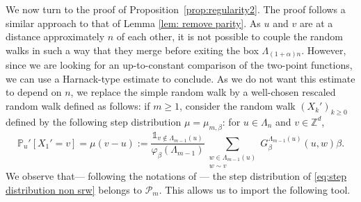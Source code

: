 \documentclass[11pt,a4paper]{article}
\numberwithin{equation}{section}
\theoremstyle{plain}
\theoremstyle{definition}
\newtheorem{Rem}[Thm]{Remark}
\begin{document}
%
We now turn to the proof of Proposition~\ref{prop:regularity2}. The proof follows a similar approach to that of Lemma \ref{lem: remove parity}. As $u$ and $v$ are at a distance approximately $n$ of each other, it is not possible to couple the random walks in such a way that they merge before exiting the box $\Lambda_{(1+\alpha)n}$. However, since we are looking for an up-to-constant comparison of the two-point functions, we can use a Harnack-type estimate to conclude. As we do not want this estimate to depend on $n$,  we replace the simple random walk by a well-chosen rescaled random walk defined as follows: if $m\geq 1$, consider the random walk $(X_k')_{k\geq 0}$ defined by the following step distribution $\mu=\mu_{m,\beta}$: for $u\in \Lambda_n$ and $v\in \mathbb Z^d$,
\begin{equation}\label{eq:step distribution non srw}
\mathbb P_u'[X_1'=v]=\mu(v-u):=\frac{\mathds{1}_{v\notin \Lambda_{m-1}(u)}}{\varphi_\beta(\Lambda_{m-1})}\sum_{\substack{w\in \Lambda_{m-1}(u)\\ w\sim v}}G_\beta^{\Lambda_{m-1}(u)}(u,w)\beta.
\end{equation}
We observe that--- following the notations of \cite[Appendix~A.2]{DumPan24Perco}--- the step distribution of \eqref{eq:step distribution non srw} belongs to $\mathcal P_m$. This allows us to import the following tool.
\end{document}
